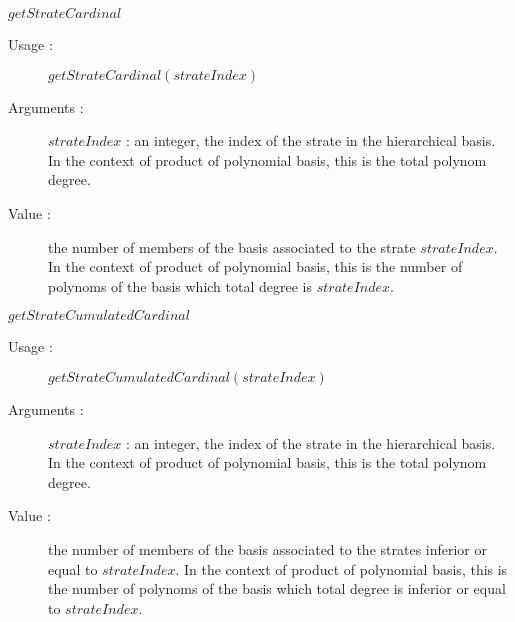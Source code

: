 \begin{description}
\begin{description}
            \bigskip
            \item $getStrateCardinal$
            \begin{description}
               \item[Usage :] $getStrateCardinal(strateIndex)$
               \item[Arguments :] $strateIndex$ : an integer, the index of the strate in the hierarchical basis. In the context of product of polynomial basis, this is the total polynom degree. 
               \item[Value :] the number of members of the basis associated to the strate $strateIndex$. In the context of product of polynomial basis, this is the number of polynoms of the basis which total degree is $strateIndex$.
            \end{description}
		
            \bigskip
            \item $getStrateCumulatedCardinal$
            \begin{description}
               \item[Usage :] $getStrateCumulatedCardinal(strateIndex)$
               \item[Arguments :] $strateIndex$ : an integer, the index of the strate in the hierarchical basis. In the context of product of polynomial basis, this is the total polynom degree.
               \item[Value :] the number of members of the basis associated to the  strates inferior or equal to $strateIndex$. In the context of product of polynomial basis, this is the number of polynoms of the basis which total degree is inferior or equal to $strateIndex$.
            \end{description}
		

\end{description}
\end{description}
